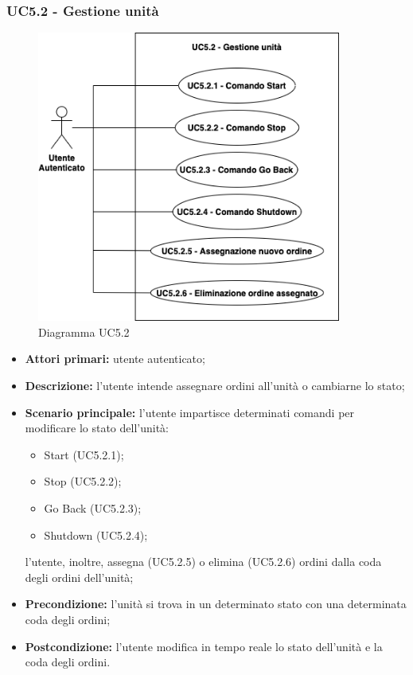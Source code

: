     \subsubsection{UC5.2 - Gestione unità}
    \begin{figure}[h!]
        \centering
        \includegraphics[width=10cm]{images/uc5.2.png}
        \caption{Diagramma UC5.2}
    \end{figure}
    \begin{itemize}
        \item \textbf{Attori primari:} utente autenticato;
        \item \textbf{Descrizione:} l'utente intende assegnare ordini all'unità o cambiarne lo stato;
        \item \textbf{Scenario principale:} l'utente impartisce determinati comandi per modificare lo stato dell'unità:
        \begin{itemize}
            \item Start (UC5.2.1);
            \item Stop (UC5.2.2);
            \item Go Back (UC5.2.3);
            \item Shutdown (UC5.2.4);
        \end{itemize}
        l'utente, inoltre, assegna (UC5.2.5) o elimina (UC5.2.6) ordini dalla coda degli ordini dell'unità;
        \item \textbf{Precondizione:} l'unità si trova in un determinato stato con una determinata coda degli ordini;
        \item \textbf{Postcondizione:} l'utente modifica in tempo reale lo stato dell'unità e la coda degli ordini.
    \end{itemize}

